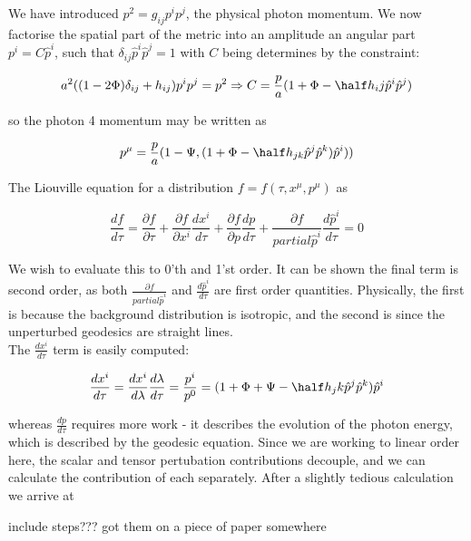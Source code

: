 We have introduced $p^2=g_{ij}p^ip^j$, the physical photon momentum. We now factorise the spatial part of the metric into an amplitude an angular part $p^i = C\hat{p}^i$, such that $\delta_{ij}\hat{p}^i\hat{p}^j=1$ with $C$ being determines by the constraint:

\begin{equation}
a^2((1-2\Phi)\delta_{ij}+h_{ij})p^ip^j = p^2 \Rightarrow C=\frac{p}{a}(1+\Phi-\half h_ij\hat{p}^i\hat{p}^j)
\end{equation}

so the photon 4 momentum may be written as 

\begin{equation}
p^\mu = \frac{p}{a}(1-\Psi, (1+\Phi-\half h_{jk}\hat{p}^j\hat{p}^k)\hat{p}^i))
\end{equation}

The Liouville equation for a distribution $f=f(\tau, x^\mu, p^\mu)$ as

\begin{equation}
\frac{df}{d\tau} = \frac{\partial f}{\partial\tau} + \frac{\partial f}{\partial x^i} \frac{dx^i}{d\tau} + \frac{\partial f}{\partial p} \frac{dp}{d\tau} + \frac{\partial f}{partial\hat{p}^i} \frac{d\hat{p}^i}{d\tau}  = 0
\label{Liouville}
\end{equation}

We wish to evaluate this to 0'th and 1'st order. It can be shown the final term is second order, as both $\frac{\partial f}{partial\hat{p}^i}$ and  $\frac{d\hat{p}^i}{d\tau}$ are first order quantities. Physically, the first is because the background distribution is isotropic, and the second is since the unperturbed geodesics are straight lines. \\

The $\frac{dx^i}{d\tau}$ term is easily computed:

\begin{equation}
\frac{dx^i}{d\tau} = \frac{dx^i}{d\lambda}\frac{d\lambda}{d\tau} = \frac{p^i}{p^0} = (1+\Phi+\Psi-\half h_jk\hat{p}^j\hat{p}^k)\hat{p}^i
\end{equation}

whereas $\frac{dp}{d\tau}$ requires more work - it describes the evolution of the photon energy, which is described by the geodesic equation. Since we are working to linear order here, the scalar and tensor pertubation contributions decouple, and we can calculate the contribution of each separately. After a slightly tedious calculation we arrive at 

include steps??? got them on a piece of paper somewhere

